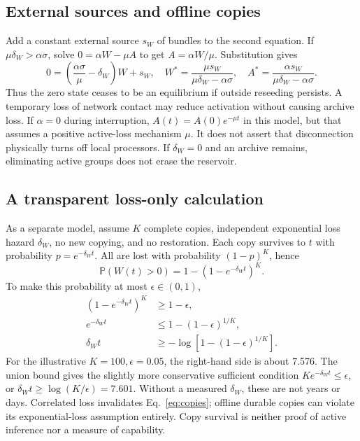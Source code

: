 \documentclass[11pt]{article}
\newcommand{\Prb}{\mathbb P}
\begin{document}
\subsection{External sources and offline copies}
Add a constant external source $s_W$ of bundles to the second equation. If $\mu\delta_W>\alpha\sigma$, solve $0=\alpha W-\mu A$ to get $A=\alpha W/\mu$. Substitution gives
\begin{equation}
0=\left(\frac{\alpha\sigma}{\mu}-\delta_W\right)W+s_W,
\quad W^*=\frac{\mu s_W}{\mu\delta_W-\alpha\sigma},
\quad A^*=\frac{\alpha s_W}{\mu\delta_W-\alpha\sigma}.
\end{equation}
Thus the zero state ceases to be an equilibrium if outside reseeding persists. A temporary loss of network contact may reduce activation without causing archive loss. If $\alpha=0$ during interruption, $A(t)=A(0)e^{-\mu t}$ in this model, but that assumes a positive active-loss mechanism $\mu$. It does not assert that disconnection physically turns off local processors. If $\delta_W=0$ and an archive remains, eliminating active groups does not erase the reservoir.

\subsection{A transparent loss-only calculation}
As a separate model, assume $K$ complete copies, independent exponential loss hazard $\delta_W$, no new copying, and no restoration. Each copy survives to $t$ with probability $p=e^{-\delta_Wt}$. All are lost with probability $(1-p)^K$, hence
\begin{equation}\label{eq:copies}
\Prb(W(t)>0)=1-(1-e^{-\delta_Wt})^K.
\end{equation}
To make this probability at most $\epsilon\in(0,1)$,
\begin{align}
(1-e^{-\delta_Wt})^K&\ge1-\epsilon,\\
e^{-\delta_Wt}&\le1-(1-\epsilon)^{1/K},\\
\delta_Wt&\ge-\log\left[1-(1-\epsilon)^{1/K}\right].
\end{align}
For the illustrative $K=100,\epsilon=0.05$, the right-hand side is about 7.576. The union bound gives the slightly more conservative sufficient condition $Ke^{-\delta_Wt}\le\epsilon$, or $\delta_Wt\ge\log(K/\epsilon)=7.601$. Without a measured $\delta_W$, these are not years or days. Correlated loss invalidates Eq.~\eqref{eq:copies}; offline durable copies can violate its exponential-loss assumption entirely. Copy survival is neither proof of active inference nor a measure of capability.
\end{document}
